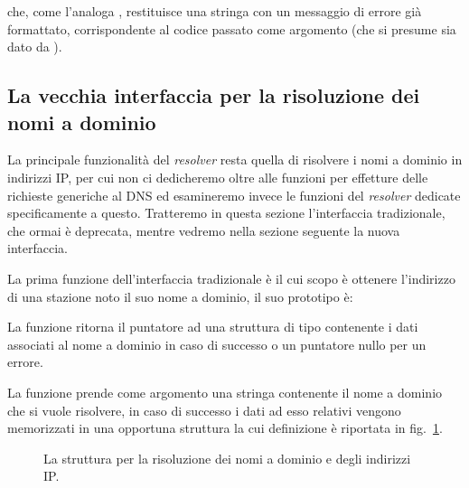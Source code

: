{\centering
\vspace{3pt}
\begin{funcbox}{
}
\end{funcbox}}

\noindent che, come  l'analoga , restituisce una stringa con un
messaggio di errore già formattato, corrispondente al codice passato come
argomento (che si presume sia dato da ).



\subsection{La vecchia interfaccia per la risoluzione dei nomi a dominio}
\label{sec:sock_name_services}

La principale funzionalità del \textit{resolver} resta quella di risolvere i
nomi a dominio in indirizzi IP, per cui non ci dedicheremo oltre alle funzioni
per effetture delle richieste generiche al DNS ed esamineremo invece le
funzioni del \textit{resolver} dedicate specificamente a questo. Tratteremo in
questa sezione l'interfaccia tradizionale, che ormai è deprecata, mentre
vedremo nella sezione seguente la nuova interfaccia.

La prima funzione dell'interfaccia tradizionale è  il cui
scopo è ottenere l'indirizzo di una stazione noto il suo nome a dominio, il
suo prototipo è:

\begin{funcproto}{
}

{La funzione ritorna il puntatore ad una
  struttura di tipo  contenente i dati associati al nome a
  dominio in caso di successo o un puntatore nullo per un errore.}
\end{funcproto}

La funzione prende come argomento una stringa  contenente il nome
a dominio che si vuole risolvere, in caso di successo i dati ad esso relativi
vengono memorizzati in una opportuna struttura  la cui
definizione è riportata in fig.~\ref{fig:sock_hostent_struct}. 

\begin{figure}[!htb]
  \footnotesize \centering
  \begin{minipage}[c]{0.80\textwidth}
  \end{minipage}
  \caption{La struttura  per la risoluzione dei nomi a
    dominio e degli indirizzi IP.}
  \label{fig:sock_hostent_struct}
\end{figure}

